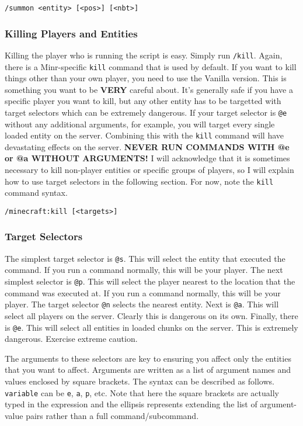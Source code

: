 \documentclass[oneside]{book}
\begin{document}
\begin{verbatim}
/summon <entity> [<pos>] [<nbt>]
\end{verbatim}

\subsubsection*{Killing Players and Entities}
Killing the player who is running the script is easy. Simply run \texttt{/kill}. Again, there is a Minr-specific \texttt{kill} command that is used by default. If you want to kill things other than your own player, you need to use the Vanilla version. This is something you want to be \textbf{VERY} careful about. It's generally safe if you have a specific player you want to kill, but any other entity has to be targetted with target selectors which can be extremely dangerous. If your target selector is \texttt{@e} without any additional arguments, for example, you will target every single loaded entity on the server. Combining this with the \texttt{kill} command will have devastating effects on the server. \textbf{NEVER RUN COMMANDS WITH @e or @a WITHOUT ARGUMENTS!} I will acknowledge that it is sometimes necessary to kill non-player entities or specific groups of players, so I will explain how to use target selectors in the following section. For now, note the \texttt{kill} command syntax.

\begin{verbatim}
/minecraft:kill [<targets>]
\end{verbatim}

\subsubsection*{Target Selectors}

The simplest target selector is \texttt{@s}. This will select the entity that executed the command. If you run a command normally, this will be your player. The next simplest selector is \texttt{@p}. This will select the player nearest to the location that the command was executed at. If you run a command normally, this will be your player. The target selector \texttt{@n} selects the nearest entity. Next is \texttt{@a}. This will select all players on the server. Clearly this is dangerous on its own. Finally, there is \texttt{@e}. This will select all entities in loaded chunks on the server. This is extremely dangerous. Exercise extreme caution.

The arguments to these selectors are key to ensuring you affect only the entities that you want to affect. Arguments are written as a list of argument names and values enclosed by square brackets. The syntax can be described as follows. \texttt{variable} can be \texttt{e}, \texttt{a}, \texttt{p}, etc. Note that here the square brackets are actually typed in the expression and the ellipsis represents extending the list of argument-value pairs rather than a full command/subcommand.
\end{document}
